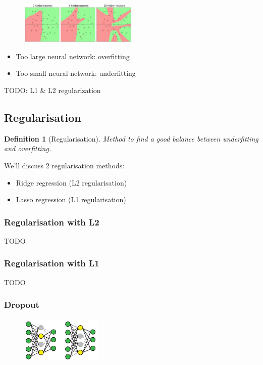 \documentclass{article}
\newtheorem{theorem}{Definition}[section]
\begin{document}
\begin{figure}[H]
    \centering
    \includegraphics[width=0.5\textwidth]{underfitting-neural.png}
\end{figure}

\begin{itemize}
    \item Too large neural network: overfitting
    \item Too small neural network: underfitting
\end{itemize}

TODO: L1 \& L2 regularization


\subsection{Regularisation}

\begin{theorem}[Regularisation]
Method to find a good balance between underfitting and overfitting.
\end{theorem}

We'll discuss 2 regularisation methods:

\begin{itemize}
    \item Ridge regression (L2 regularisation)
    \item Lasso regression (L1 regularisation)
\end{itemize}

\subsubsection{Regularisation with L2}

TODO

\subsubsection{Regularisation with L1}

TODO

\subsubsection{Dropout}

\begin{figure}[H]
    \centering
    \includegraphics[width=0.35\textwidth]{dropout.png}
\end{figure}
\end{document}
